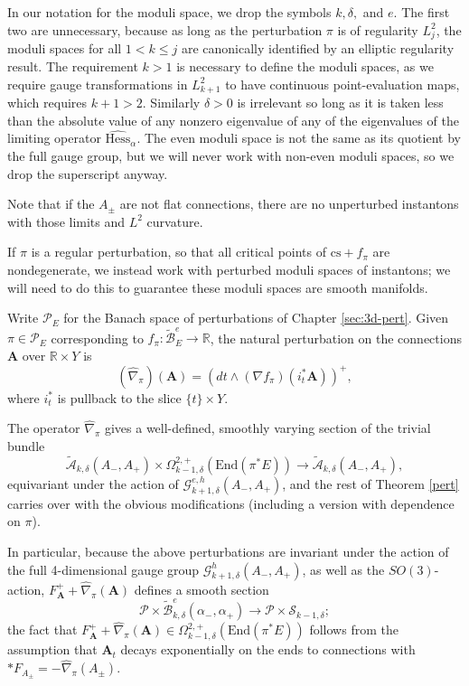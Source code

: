 \documentclass{memo-l}
\newcommand{\pE}{\pi^* \! E}
\theoremstyle{definition}
\theoremstyle{remark}
\numberwithin{section}{chapter}
\numberwithin{equation}{chapter}
\begin{document}
In our notation for the moduli space, we drop the symbols $k,\delta,$ and $e$. The first two are unnecessary, because as long as the perturbation $\pi$ is of regularity $L^2_j$, the moduli spaces for all $1 < k \leq j$ are canonically identified by an elliptic regularity result. The requirement $k > 1$ is necessary to define the moduli spaces, as we require gauge transformations in $L^2_{k+1}$ to have continuous point-evaluation maps, which requires $k+1 > 2$. Similarly $\delta > 0$ is irrelevant so long as it is taken less than the absolute value of any nonzero eigenvalue of any of the eigenvalues of the limiting operator $\widehat{\text{Hess}}_{\alpha}$. The even moduli space is not the same as its quotient by the full gauge group, but we will never work with non-even moduli spaces, so we drop the superscript anyway.

Note that if the $A_\pm$ are not flat connections, there are no unperturbed instantons with those limits and $L^2$ curvature. 

If $\pi$ is a regular perturbation, so that all critical points of $\text{cs}+f_\pi$ are nondegenerate, we instead work with perturbed moduli spaces of instantons; we will need to do this to guarantee these moduli spaces are smooth manifolds.

Write $\mathcal P_E$ for the Banach space of perturbations of Chapter \ref{sec:3d-pert}. Given $\pi \in \mathcal P_E$ corresponding to $f_\pi: \widetilde{\mathcal B}^e_E \to \mathbb R$, the natural perturbation on the connections $\mathbf{A}$ over $\mathbb R \times Y$ is $$(\widehat \nabla_\pi)(\mathbf{A}) = \left(dt \wedge (\nabla f_\pi)(i_t^*\mathbf{A})\right)^+,$$ where $i_t^*$ is pullback to the slice $\{t\} \times Y$.

The operator $\widehat \nabla_\pi$ gives a well-defined, smoothly varying section of the trivial bundle $$\widetilde{\mathcal A}_{k,\delta}(A_-, A_+) \times \Omega^{2,+}_{k-1,\delta}(\text{End}(\pE)) \to \widetilde{\mathcal A}_{k,\delta}(A_-, A_+),$$ 
equivariant under the action of $\mathcal G^{e,h}_{k+1,\delta}(A_-, A_+)$, and the rest of Theorem \ref{pert} carries over with the obvious modifications (including a version with dependence on $\pi$). 

In particular, because the above perturbations are invariant under the action of the full 4-dimensional gauge group $\mathcal G^h_{k+1,\delta}(A_-, A_+)$, as well as the $SO(3)$-action, $F_{\mathbf{A}}^+ + \widehat\nabla_\pi(\mathbf{A})$ defines a smooth section 
\begin{equation}\label{ASDsec}\mathcal P \times \widetilde{\mathcal B}^e_{k,\delta}(\alpha_-, \alpha_+) \to \mathcal P \times \mathcal S_{k-1,\delta};\end{equation}
the fact that $F_{\mathbf{A}}^+ + \widehat \nabla_\pi(\mathbf{A}) \in \Omega^{2,+}_{k-1,\delta}\left(\text{End}(\pE)\right)$ follows from the assumption that $\mathbf{A}_t$ decays exponentially on the ends to connections with $*F_{A_\pm} = - \widehat \nabla_\pi(A_\pm)$. 
\end{document}
